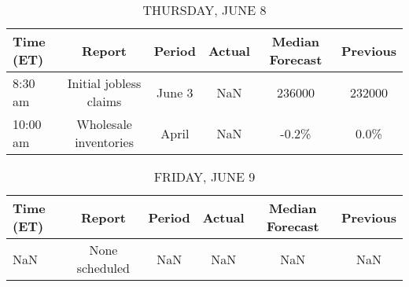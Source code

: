 \documentclass{article}%
\begin{document}
%


\begin{table}[htbp]%
\caption{THURSDAY, JUNE 8}%
\centering%
\begin{adjustbox}{width=1\textwidth}%
\begin{tabular}{lccccc}
\toprule
Time (ET) &                 Report & Period & Actual & Median Forecast & Previous \\
\midrule
  8:30 am & Initial jobless claims & June 3 &    NaN &          236000 &   232000 \\
 10:00 am &  Wholesale inventories &  April &    NaN &           -0.2\% &     0.0\% \\
\bottomrule
\end{tabular}
%
\end{adjustbox}%
\end{table}

%


\begin{table}[htbp]%
\caption{FRIDAY, JUNE 9}%
\centering%
\begin{adjustbox}{width=1\textwidth}%
\begin{tabular}{lccccc}
\toprule
Time (ET) &         Report & Period & Actual & Median Forecast & Previous \\
\midrule
      NaN & None scheduled &    NaN &    NaN &             NaN &      NaN \\
\bottomrule
\end{tabular}
%
\end{adjustbox}%
\end{table}
\end{document}
